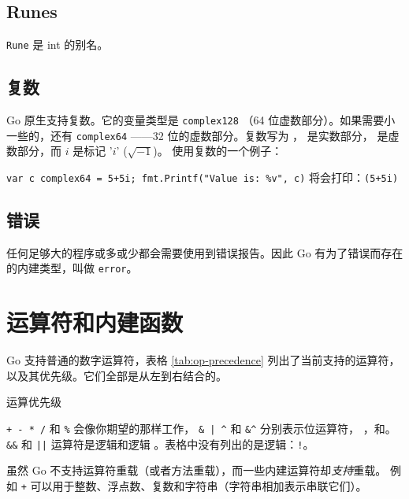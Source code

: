 \subsection{Runes}
\lstinline{Rune} 是 int 的别名。

\subsection{复数}
Go 原生支持复数。它的变量类型是 \lstinline{complex128}
（64 位虚数部分）。如果需要小一些的，还有 \lstinline{complex64}
——32 位的虚数部分。复数写为 ， 是实数部分，
 是虚数部分，而 $i$ 是标记 '$i$' ($\sqrt{-1}$)。
使用复数的一个例子：

\lstinline{var c complex64 = 5+5i; fmt.Printf("Value is: %v", c)}\newline
将会打印：\lstinline{(5+5i)}

\subsection{错误}
任何足够大的程序或多或少都会需要使用到错误报告。因此 Go 有为了错误而存在的内建类型，叫做 \lstinline{error}。

\section{运算符和内建函数}
\label{sec:builtins}
Go 支持普通的数字运算符，表格 \ref{tab:op-precedence} 列出了当前支持的运算符，
以及其优先级。它们全部是从左到右结合的。

\begin{table}[H]
\begin{center}
\caption{运算优先级}
\label{tab:op-precedence}

\end{center}
\end{table}
\verb|+ - * /| 和 \verb|%| 会像你期望的那样工作，
\verb!& | ^!
和 \verb!&^! 分别表示位运算符，
，和。
\verb|&&| 和 \verb/||/ 运算符是逻辑和逻辑
。表格中没有列出的是逻辑：\verb/!/。

虽然 Go 不支持运算符重载（或者方法重载），而一些内建运算符却\emph{支持}重载。
例如 \texttt{+} 可以用于整数、浮点数、复数和字符串（字符串相加表示串联它们）。

